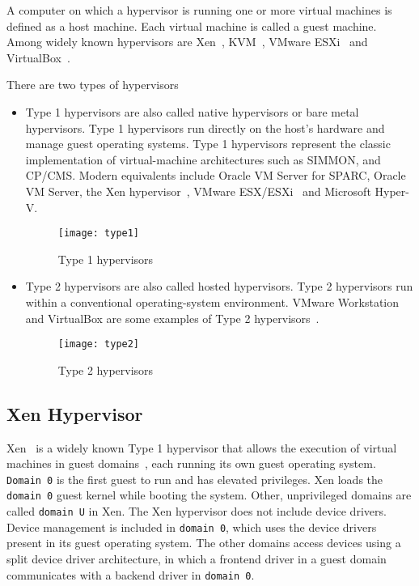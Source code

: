 A computer on which a hypervisor is running one or more virtual
machines is defined as a host machine. Each virtual machine is
called a guest machine.  Among widely known
hypervisors are Xen~\cite{barham2003xen, Chisnall:2007:DGX:1407351},
KVM~\cite{Habib:2008:VK:1344209.1344217, kivity2007kvm},
VMware ESXi~\cite{Agesen:2010:EXV:1899928.1899930} and
VirtualBox~\cite{camargos2008virtualization}.

There are two types of hypervisors~\cite{Popek:1974:FRV:361011.361073}
\begin{itemize}
\item Type 1 hypervisors are also called native hypervisors or bare metal
hypervisors. Type 1 hypervisors run directly on the host's hardware
and manage guest operating systems. Type 1 hypervisors represent the
classic implementation of virtual-machine architectures such as SIMMON, %
and CP/CMS. Modern equivalents include Oracle VM Server for SPARC,
Oracle VM Server, the Xen hypervisor~\cite{barham2003xen}, VMware
ESX/ESXi~\cite{Agesen:2010:EXV:1899928.1899930} and Microsoft Hyper-V.

\begin{figure}[!ht]
\centering
\texttt{[image: type1]}
\caption{Type 1 hypervisors}
\label{Type 1 hypervisor}
\end{figure}
\item Type 2 hypervisors are also called hosted hypervisors. Type
2 hypervisors run within a conventional operating-system
environment. VMware Workstation and VirtualBox are some examples
of Type 2 hypervisors~\cite{Sugerman:2001:VID:647055.715774,
camargos2008virtualization}.

\begin{figure}[!ht]
\centering
\texttt{[image: type2]}
\caption{Type 2 hypervisors}
\label{fig:Type 2 hypervisor}
\end{figure}
\end{itemize}

\subsection{Xen Hypervisor}
Xen~\cite{barham2003xen} is a widely known Type 1 hypervisor
that allows the execution of virtual machines in guest 
domains~\cite{king2003operating}, each running its own
guest operating system.
\texttt{Domain 0} is the first guest to
run and has elevated privileges. Xen loads the \texttt{domain 0} guest
kernel while booting the system.  Other, unprivileged domains are called 
\texttt{domain U} in Xen. 
The Xen hypervisor does not include device drivers. Device management is
included in \texttt{domain 0}, which uses the
device drivers present in its guest operating system. The other domains
access devices using a split device driver architecture, in which a
frontend driver in a guest domain communicates with a backend driver in
\texttt{domain 0}.

